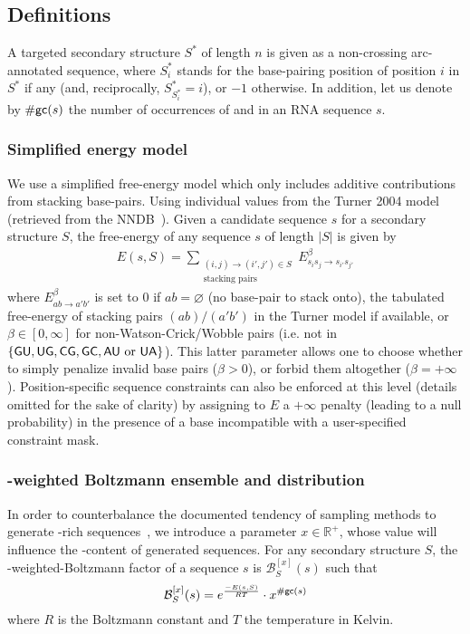 \documentclass{bioinfo}
\newcommand{\GCContent}{\Gb\Cb-content\xspace}
\newcommand{\GCWeighted}{\Gb\Cb-weighted\xspace}
\newcommand{\B}{\mathcal{B}}
\newcommand{\Ab}{{\sf{A}}\xspace}
\newcommand{\Cb}{{\sf{C}}\xspace}
\newcommand{\Gb}{{\sf{G}}\xspace}
\newcommand{\Ub}{{\sf{U}}\xspace}
\newcommand{\gc}{{\#\text{{\sf gc}}}}
\newcommand{\ES}{{{E}}}
\newcommand{\Target}{{S}^*}
\newcommand{\Struct}{{S}}
\begin{document}
\subsection{Definitions}

A targeted secondary structure $\Target$ of length $n$ is given as a non-crossing arc-annotated sequence,  where 
$\Target_i$ stands for the base-pairing position of position $i$ in $\Target$ if any (and, reciprocally, $\Target_{\Target_i}=i$), or $-1$ otherwise. 
In addition, let us denote by $\gc(s)$ the number of occurrences of \Gb and \Cb in an RNA sequence $s$.

\subsubsection{Simplified energy model}
We use a simplified free-energy model which only includes additive contributions from stacking base-pairs. Using individual values from the Turner 2004 model (retrieved from the NNDB~\citep{Turner2010}). Given a candidate sequence $s$ for a secondary structure $\Struct$, the free-energy of any sequence $s$ of length $|\Struct|$  is given by
\begin{align*}
  \ES(s,\Struct) = \sum_{\substack{(i,j)\to (i',j')\in \Struct\\ \text{stacking pairs}}}\ES^{\beta}_{s_is_j\to s_{i'}s_{j'}} 
\end{align*}
where $\ES^{\beta}_{ab\to a'b'}$ is set to $0$ if $ab=\varnothing$ (no base-pair to stack onto), the tabulated free-energy of stacking pairs $(ab)/(a'b')$ in the Turner model if available, or $\beta\in[0,\infty]$ for non-Watson-Crick/Wobble pairs (i.e. not in $\{\Gb\Ub,\Ub\Gb,\Cb\Gb,\Gb\Cb, \Ab\Ub\text{ or }\Ub\Ab\}$). This latter parameter allows one to choose whether to simply penalize invalid base pairs ($\beta>0$), or forbid them altogether ($\beta = +\infty$). 
Position-specific sequence constraints can also be enforced at this level (details omitted for the sake of clarity) by assigning to $\ES$ a $+\infty$ penalty (leading to a null probability) in the presence of a base incompatible with a user-specified constraint mask.


\subsubsection{\GCWeighted Boltzmann ensemble and distribution}

In order to counterbalance the documented tendency of sampling methods to generate \Gb\Cb-rich sequences~\citep{Levin:2012kx}, we introduce a parameter $x\in\mathbb{R}^+$, whose value will influence the \GCContent of generated sequences. For any secondary structure $\Struct$, the \GCWeighted-Boltzmann factor of a sequence $s$ is $\B^{[x]}_{\Struct}(s)$  such that
\begin{equation}
\B_{\Struct}^{[x]}(s) = e^{\frac{-\ES(s,\Struct)}{RT}}\cdot x^{\gc(s)}
\label{def:genBoltz}
\end{equation}
where $R$ is the Boltzmann constant and $T$ the temperature in Kelvin.
\end{document}
